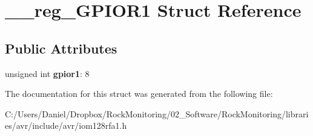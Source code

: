 \hypertarget{struct____reg___g_p_i_o_r1}{}\section{\+\_\+\+\_\+reg\+\_\+\+G\+P\+I\+O\+R1 Struct Reference}
\label{struct____reg___g_p_i_o_r1}
\subsection*{Public Attributes}
\begin{DoxyCompactItemize}
\item 
unsigned int {\bfseries gpior1}\+: 8\hypertarget{struct____reg___g_p_i_o_r1_a446768c675b787a38007d8ec21856e8f}{}\label{struct____reg___g_p_i_o_r1_a446768c675b787a38007d8ec21856e8f}

\end{DoxyCompactItemize}


The documentation for this struct was generated from the following file\+:\begin{DoxyCompactItemize}
\item 
C\+:/\+Users/\+Daniel/\+Dropbox/\+Rock\+Monitoring/02\+\_\+\+Software/\+Rock\+Monitoring/libraries/avr/include/avr/iom128rfa1.\+h\end{DoxyCompactItemize}
